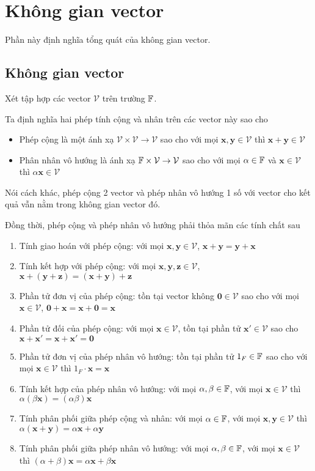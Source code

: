 \chapter{Không gian vector}

Phần này định nghĩa tổng quát của không gian vector.

\section{Không gian vector}

Xét tập hợp các vector $\mathcal{V}$ trên trường $\mathbb{F}$.

Ta định nghĩa hai phép tính cộng và nhân trên các vector này sao cho

\begin{itemize}[noitemsep]
    \item Phép cộng là một ánh xạ $\mathcal{V} \times \mathcal{V} \to \mathcal{V}$ sao cho
    với mọi $\bm{x}, \bm{y} \in \mathcal{V}$ thì $\bm{x} + \bm{y} \in \mathcal{V}$
    \item Phân nhân vô hướng là ánh xạ $\mathbb{F} \times \mathcal{V} \to \mathcal{V}$ sao cho
    với mọi $\alpha \in \mathbb{F}$ và $\bm{x} \in \mathcal{V}$ thì $\alpha \bm{x} \in \mathcal{V}$
\end{itemize}

Nói cách khác, phép cộng 2 vector và phép nhân vô hướng 1 số với vector cho kết quả vẫn nằm trong không gian vector đó.

Đồng thời, phép cộng và phép nhân vô hướng phải thỏa mãn các tính chất sau

\begin{enumerate}[noitemsep]
    \item Tính giao hoán với phép cộng: với mọi $\bm{x}, \bm{y} \in \mathcal{V}$, $\bm{x} + \bm{y} = \bm{y} + \bm{x}$
    \item Tính kết hợp với phép cộng: với mọi $\bm{x}, \bm{y}, \bm{z} \in \mathcal{V}$, $\bm{x} + (\bm{y} + \bm{z}) = (\bm{x} + \bm{y}) + \bm{z}$
    \item Phần tử đơn vị của phép cộng: tồn tại vector không $\bm{0} \in \mathcal{V}$ sao cho với mọi $\bm{x} \in \mathcal{V}$, $\bm{0} + \bm{x} = \bm{x} + \bm{0} = \bm{x}$
    \item Phần tử đối của phép cộng: với mọi $\bm{x} \in \mathcal{V}$, tồn tại phần tử $\bm{x'} \in \mathcal{V}$ sao cho $\bm{x} + \bm{x'} = \bm{x} + \bm{x'} = \bm{0}$
    \item Phần tử đơn vị của phép nhân vô hướng: tồn tại phần tử $1_F \in \mathbb{F}$ sao cho với mọi $\bm{x} \in \mathcal{V}$ thì $1_F \cdot \bm{x} = \bm{x}$
    \item Tính kết hợp của phép nhân vô hướng: với mọi $\alpha, \beta \in \mathbb{F}$, với mọi $\bm{x} \in \mathcal{V}$ thì $\alpha (\beta \bm{x}) = (\alpha \beta) \bm{x}$
    \item Tính phân phối giữa phép cộng và nhân: với mọi $\alpha \in \mathbb{F}$, với mọi $\bm{x}, \bm{y} \in \mathcal{V}$ thì $\alpha (\bm{x} + \bm{y}) = \alpha \bm{x} + \alpha \bm{y}$
    \item Tính phân phối giữa phép nhân vô hướng: với mọi $\alpha, \beta \in \mathbb{F}$, với mọi $\bm{x} \in \mathcal{V}$ thì $(\alpha + \beta) \bm{x} = \alpha \bm{x} + \beta \bm{x}$
\end{enumerate}


